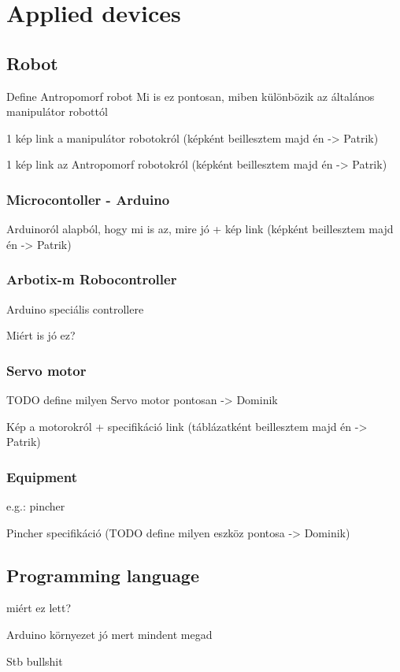 
\chapter{Applied devices}

\section{Robot}

	Define Antropomorf robot
		Mi is ez pontosan, miben különbözik az általános manipulátor robottól
		
		1 kép link a manipulátor robotokról (képként beillesztem majd én -> Patrik)
		
		1 kép link az Antropomorf robotokról (képként beillesztem majd én -> Patrik)

	\subsection{Microcontoller - Arduino}
	
		Arduinoról alapból, hogy mi is az, mire jó + kép link (képként beillesztem majd én -> Patrik)
		
	\subsection{Arbotix-m Robocontroller}
	
		Arduino speciális controllere
		
		Miért is jó ez?

	\subsection{Servo motor}
	
		TODO define milyen Servo motor pontosan -> Dominik
	
		Kép a motorokról + specifikáció link (táblázatként beillesztem majd én -> Patrik)

	\subsection{Equipment}
	e.g.: pincher
	
		Pincher specifikáció (TODO define milyen eszköz pontosa -> Dominik)

\section{Programming language}

miért ez lett?

Arduino környezet jó mert mindent megad 

Stb bullshit